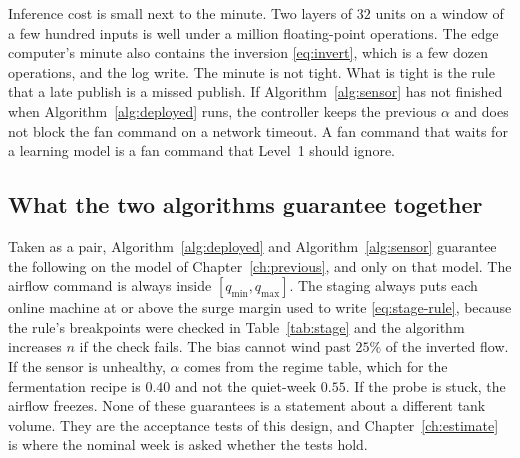 Inference cost is small next to the minute. Two layers of $32$ units on a window of a few hundred inputs is well under a million floating-point operations. The edge computer's minute also contains the inversion \eqref{eq:invert}, which is a few dozen operations, and the log write. The minute is not tight. What is tight is the rule that a late publish is a missed publish. If Algorithm~\ref{alg:sensor} has not finished when Algorithm~\ref{alg:deployed} runs, the controller keeps the previous $\alpha$ and does not block the fan command on a network timeout. A fan command that waits for a learning model is a fan command that Level~1 should ignore.

\subsection{What the two algorithms guarantee together}

Taken as a pair, Algorithm~\ref{alg:deployed} and Algorithm~\ref{alg:sensor} guarantee the following on the model of Chapter~\ref{ch:previous}, and only on that model. The airflow command is always inside $[q_{\min},q_{\max}]$. The staging always puts each online machine at or above the surge margin used to write \eqref{eq:stage-rule}, because the rule's breakpoints were checked in Table~\ref{tab:stage} and the algorithm increases $n$ if the check fails. The bias cannot wind past $25\%$ of the inverted flow. If the sensor is unhealthy, $\alpha$ comes from the regime table, which for the fermentation recipe is $0.40$ and not the quiet-week $0.55$. If the probe is stuck, the airflow freezes. None of these guarantees is a statement about a different tank volume. They are the acceptance tests of this design, and Chapter~\ref{ch:estimate} is where the nominal week is asked whether the tests hold.
